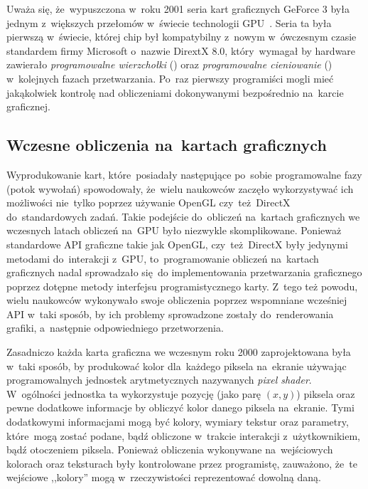 Uważa się, że~wypuszczona w~roku 2001 seria kart graficznych GeForce 3 była jednym z~większych przełomów w~świecie technologii GPU~\cite{nvidia:geforce3,Cuda:Example}. Seria ta była pierwszą w~świecie, której chip był kompatybilny z~nowym w~ówczesnym czasie standardem firmy Microsoft o~nazwie DirextX 8.0, który~wymagał by hardware zawierało \emph{programowalne wierzchołki} () oraz \emph{programowalne cieniowanie} () w~kolejnych fazach przetwarzania. Po~raz pierwszy programiści mogli mieć jakąkolwiek kontrolę nad obliczeniami dokonywanymi bezpośrednio na~karcie graficznej.

\subsection{Wczesne obliczenia na~kartach graficznych}
\label{sec:wczesne}

Wyprodukowanie kart, które~posiadały następujące po~sobie programowalne fazy (potok wywołań) spowodowały, że~wielu naukowców zaczęło wykorzystywać ich możliwości nie~tylko poprzez używanie OpenGL czy~też~DirectX do~standardowych zadań. Takie podejście do~obliczeń na~kartach graficznych we wczesnych latach obliczeń na~GPU było niezwykle skomplikowane. Ponieważ standardowe API graficzne takie jak OpenGL, czy~też~DirectX były jedynymi metodami do~interakcji z~GPU, to~programowanie obliczeń na~kartach graficznych nadal sprowadzało się~do implementowania przetwarzania graficznego poprzez dotępne metody interfejsu programistycznego karty. Z~tego też powodu, wielu naukowców wykonywało swoje obliczenia poprzez wspomniane wcześniej API w~taki sposób, by ich problemy sprowadzone zostały do~renderowania grafiki, a~następnie odpowiedniego przetworzenia.

Zasadniczo każda karta graficzna we wczesnym roku 2000 zaprojektowana była w~taki sposób, by produkować kolor dla~każdego piksela na~ekranie używając programowalnych jednostek arytmetycznych nazywanych \emph{pixel shader}. W~ogólności jednostka ta wykorzystuje pozycję (jako parę $(x, y)$) piksela oraz pewne dodatkowe informacje by obliczyć kolor danego piksela na~ekranie. Tymi dodatkowymi informacjami mogą być kolory, wymiary tekstur oraz parametry, które~mogą zostać podane, bądź obliczone w~trakcie interakcji z~użytkownikiem, bądź otoczeniem piksela. Ponieważ obliczenia wykonywane na~wejściowych kolorach oraz teksturach były kontrolowane przez programistę, zauważono, że~te wejściowe ,,kolory'' mogą w~rzeczywistości reprezentować dowolną daną.

